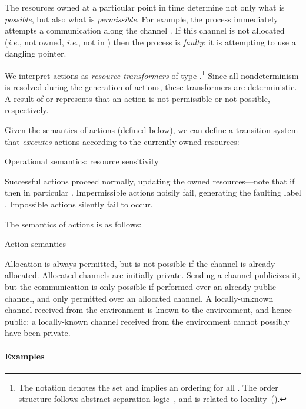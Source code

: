 \documentclass{entcs}
\begin{document}
The resources owned at a particular point in time determine not only
what is \emph{possible}, but also what is \emph{permissible}.  For
example, the process  immediately attempts a communication
along the channel .  If this channel is not allocated (\emph{i.e.},
not owned, \emph{i.e.}, not in ) then the process is
\emph{faulty}: it is attempting to use a dangling pointer.

We interpret actions  as \emph{resource transformers} of type
.\footnote{ The notation
   denotes the set  and
  implies an ordering  for all .  The order structure follows abstract separation
  logic~\cite{Calcagno2007}, and is related to
  locality~().  }
Since all nondeterminism is resolved
during the generation of actions, these transformers are
deterministic.  A result of  or  represents that an action
is not permissible or not possible, respectively.

Given the semantics  of
actions (defined below), we can define a transition system that
\emph{executes} actions according to the currently-owned resources:
\begin{display}
[]{Operational semantics: resource sensitivity}

\end{display}
Successful actions proceed normally, updating the owned
resources---note that if  then in
particular .  Impermissible
actions noisily fail, generating the faulting label .
Impossible actions silently fail to occur.









The semantics of actions is as follows:
\begin{display}[]{Action semantics}

\end{display}
Allocation is always permitted, but is not possible if the channel is
already allocated.  Allocated channels are initially private.  Sending
a channel publicizes it, but the communication is only possible if
performed over an already public channel, and only permitted over an
allocated channel.  A locally-unknown channel received from the
environment is known to the environment, and hence public; a
locally-known channel received from the environment cannot possibly
have been private.

\paragraph{Examples}
\end{document}
